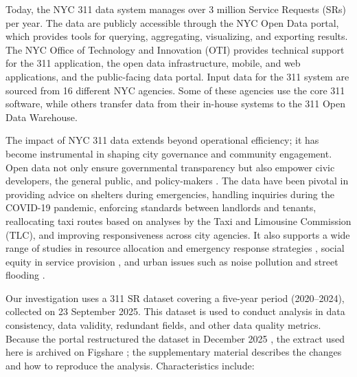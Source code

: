 \documentclass[linenumber]{jdsart}
\begin{document}
%


Today, the NYC 311 data system manages over 3 million Service
Requests (SRs) per year. The data are publicly accessible 
through the NYC Open Data portal, which provides 
tools for querying, aggregating,
visualizing, and exporting results. The NYC Office of Technology 
and Innovation (OTI) provides technical support for the 311 application, 
the open data infrastructure, mobile, and web applications, 
and the public-facing data portal. Input data for the 311 system 
are sourced from 16 different NYC agencies. Some of these agencies
use the core 311 software, while others transfer data from their 
in-house systems to the 311 Open Data 
Warehouse.


The impact of NYC 311 data extends beyond operational efficiency; it
has become instrumental in shaping city governance and community
engagement. Open data not only ensure governmental transparency
but also empower civic developers, the general public, and
policy-makers \citep{minkoff2016nyc, o2017uncharted,
  kontokosta2021bias}.
The data have been pivotal in providing advice on shelters
during emergencies, handling inquiries during the COVID-19 
pandemic, enforcing standards between landlords 
and tenants, reallocating taxi
routes based on analyses by the Taxi and Limousine Commission (TLC),
and improving responsiveness across city agencies.
It also supports a wide range of studies in resource allocation and
emergency response strategies \citep{zha2014profiling, raj2021swift},
social equity in service provision \citep{white2018promises,
kontokosta2021bias}, and urban issues such as noise pollution
\citep{dove2022sounds} and street flooding
\citep{agonafir2022understanding}.


Our investigation uses a 311 SR dataset covering a five-year period (2020--2024), 
collected on 23 September 2025. This dataset is used 
to conduct analysis in data consistency, data validity, 
redundant fields, and other data quality metrics.
Because the portal restructured the dataset in December 2025
\citep{nyc311_updates}, the extract used here is archived on Figshare
\citep{nyc311_data}; the supplementary material describes the changes
and how to reproduce the analysis. Characteristics include:
\end{document}
